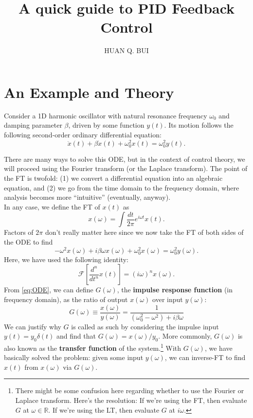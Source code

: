 \documentclass{article}
\theoremstyle{definition}
\newcommand{\F}{\mathcal{F}}
\newcommand{\be}{\beta}
\newcommand{\f}[2]{\frac{#1}{#2}}
\newcommand{\lb}{\left[}
\newcommand{\rb}{\right]}
\begin{document}
\title{A quick guide to PID Feedback Control}
\author{HUAN Q. BUI}	
\maketitle



\section{An Example and Theory}

Consider a 1D harmonic oscillator with natural resonance frequency $\omega_0$ and damping parameter $\beta$, driven by some function $y(t)$. Its motion follows the following second-order ordinary differential equation:
\begin{equation*}
\ddot{x}(t) + \be \dot{x}(t) + \omega_0^2 x(t) = \omega_0^2 y(t).
\end{equation*}

There are many ways to solve this ODE, but in the context of control theory, we will proceed using the Fourier transform (or the Laplace transform). The point of the FT is twofold: (1) we convert a differential equation into an algebraic equation, and (2) we go from the time domain to the frequency domain, where analysis becomes more ``intuitive'' (eventually, anyway).  \\

\noindent In any case, we define the FT of $x(t)$ as 
\begin{equation*}
x(\omega) = \int \f{d t }{2\pi } e^{i\omega t} x(t). 
\end{equation*}
Factors of $2\pi$ don't really matter here since we now take the FT of both sides of the ODE to find
\begin{equation}\label{eq:ODE}
-\omega^2 x(\omega) + i\beta \omega x(\omega) + \omega_0^2 x(\omega) = \omega_0^2 y(\omega).
\end{equation}
Here, we have used the following identity:
\begin{equation*}
\F\lb \f{d^n }{dt^n} x(t) \rb = (i\omega)^n x(\omega).
\end{equation*}
From \eqref{eq:ODE}, we can define $G(\omega)$, the \textbf{impulse response function} (in frequency domain), as the ratio of output $x(\omega)$ over input $y(\omega)$:
\begin{equation*}
G(\omega) \equiv \f{x(\omega)}{y(\omega)} = \f{1}{(\omega_0^2 - \omega^2) + i\beta \omega}
\end{equation*}
We can justify why $G$ is called as such by considering the impulse input $y(t) = y_0 \delta(t)$ and find that $G(\omega) = x(\omega)/y_0$. More commonly, $G(\omega)$ is also known as the \textbf{transfer function} of the system.\footnote{There might be some confusion here regarding whether to use the Fourier or Laplace transform. Here's the resolution: If we're using the FT, then evaluate $G$ at $\omega\in \mathbb{R}$. If we're using the LT, then evaluate $G$ at $i\omega$.} With $G(\omega)$, we have basically solved the problem: given some input $y(\omega)$, we can inverse-FT to find $x(t)$ from $x(\omega)$ via $G(\omega)$. 
\end{document}
